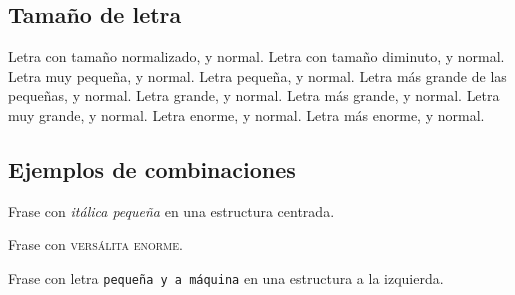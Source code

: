 \documentclass{article}
\begin{document}
\subsection{Tamaño de letra}
\normalsize{Letra con tamaño normalizado}, y normal.
\newline
\newline
{\tiny{Letra con tamaño diminuto}}, y normal.
\newline
\newline
{\scriptsize{Letra muy pequeña}}, y normal.
\newline
\newline
{\footnotesize{Letra pequeña}}, y normal.
\newline
\newline
{\small{Letra más grande de las pequeñas}}, y normal.
\newline
\newline
{\large{Letra grande}}, y normal.
\newline
\newline
{\Large{Letra más grande}}, y normal.
\newline
\newline
{\LARGE{Letra muy grande}}, y normal.
\newline
\newline
{\huge{Letra enorme}}, y normal.
\newline
\newline
{\Huge{Letra más enorme}}, y normal.
\subsection{Ejemplos de combinaciones}
\begin{center}
Frase con \small{\textit{itálica pequeña}} en una estructura centrada.
\end{center}
Frase con {\Huge{\textsc{versálita enorme}}}.
\begin{flushleft}
Frase con letra {\tiny{\texttt{pequeña y a máquina}}} en una estructura a la izquierda.
\end{flushleft}
\end{document}

